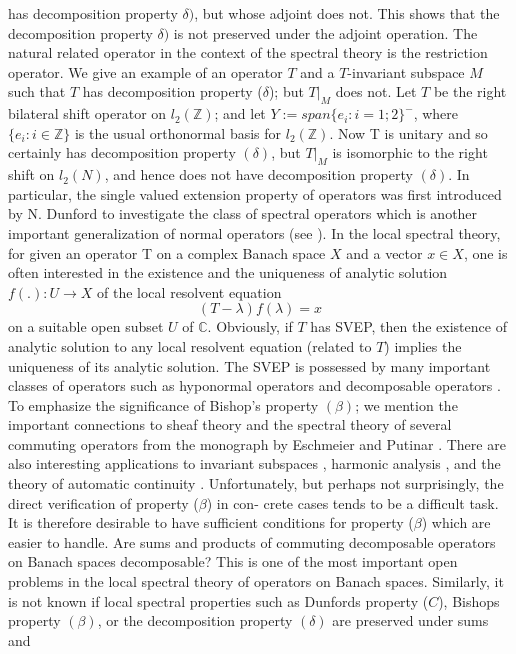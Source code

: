 \documentclass[12pt,a4paper]{amsart}
\begin{document}
has decomposition property $\delta)$, but whose adjoint does not.
This shows that the decomposition property $\delta)$ is not
preserved under the adjoint operation. The natural related
operator in the context of the spectral theory is the restriction
operator. We give an example of an operator $T$ and a
$T$-invariant subspace $M$ such that $T$ has decomposition
property ($\delta$); but $T|_{M}$ does not. Let $T$ be the right
bilateral shift operator on $l_{2}(\mathbb{Z})$; and let $Y :=
span\{e_{i} : i = 1; 2\}^{-}$, where $\{e_{i} : i\in \mathbb{Z}\}$
is the usual orthonormal basis for $l_{2}(\mathbb{Z})$. Now T is
unitary and so certainly has decomposition property $(\delta)$,
but $T|_{M}$ is isomorphic to the right shift on $l_{2}(N)$, and
hence does not have decomposition property $(\delta)$. In
particular, the single valued extension property of operators was
first introduced by N. Dunford to investigate the class of
spectral operators which is another important generalization of
normal operators (see \cite{8}). In the local spectral theory, for
given an operator T on a complex Banach space $X$ and a vector $x
\in X$, one is often interested in the existence and the
uniqueness of analytic solution $f(.) : U \rightarrow X$ of the
local resolvent equation $$(T -\lambda)f(\lambda) = x$$ on a
suitable open subset $U$ of $\mathbb{C}$. Obviously, if $T$ has
SVEP, then the existence of analytic solution to any local
resolvent equation (related to $T$) implies the uniqueness of its
analytic solution. The SVEP is possessed by many important classes
of operators such as hyponormal operators and decomposable
operators \cite{7,14}. To emphasize the significance of Bishop's
property $(\beta)$; we mention the important connections to sheaf
theory and the spectral theory of several commuting operators from
the monograph by Eschmeier and Putinar \cite{9}. There are also
interesting applications to invariant subspaces \cite{9}, harmonic
analysis \cite{10}, and the theory of automatic continuity
\cite{15}. Unfortunately, but perhaps not surprisingly, the direct
verification of property ($\beta$) in con- crete cases tends to be
a difficult task. It is therefore desirable to have sufficient
conditions for property ($\beta$) which are easier to handle. Are
sums and products of commuting decomposable operators on Banach
spaces decomposable? This is one of the most important open
problems in the local spectral theory of operators on Banach
spaces. Similarly, it is not known if local spectral properties
such as Dunfords property ($C$), Bishops property $(\beta)$, or
the decomposition property $(\delta)$ are preserved under sums and
\end{document}
